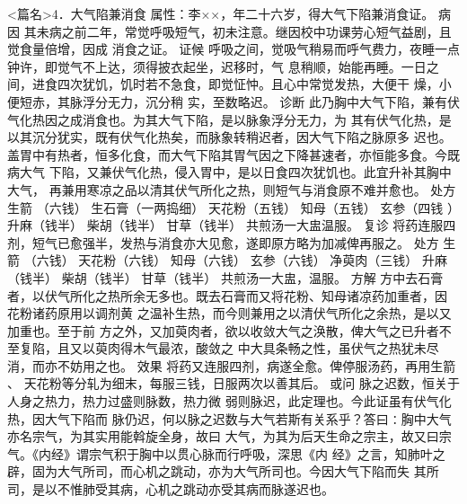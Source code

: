 \documentclass[a4paper,12pt,UTF8,twoside]{ctexbook}
\begin{document}
<篇名>4．大气陷兼消食
属性：李××，年二十六岁，得大气下陷兼消食证。 
病因 其未病之前二年，常觉呼吸短气，初未注意。继因校中功课劳心短气益剧，且觉食量倍增，因成 
消食之证。 
证候 呼吸之间，觉吸气稍易而呼气费力，夜睡一点钟许，即觉气不上达，须得披衣起坐，迟移时，气 
息稍顺，始能再睡。一日之间，进食四次犹饥，饥时若不急食，即觉怔忡。且心中常觉发热，大便干 
燥，小便短赤，其脉浮分无力，沉分稍 
实，至数略迟。 
诊断 此乃胸中大气下陷，兼有伏气化热因之成消食也。为其大气下陷，是以脉象浮分无力，为 
其有伏气化热，是以其沉分犹实，既有伏气化热矣，而脉象转稍迟者，因大气下陷之脉原多 
迟也。盖胃中有热者，恒多化食，而大气下陷其胃气因之下降甚速者，亦恒能多食。今既病大气 
下陷，又兼伏气化热，侵入胃中，是以日食四次犹饥也。此宜升补其胸中大气， 
再兼用寒凉之品以清其伏气所化之热，则短气与消食原不难并愈也。 
处方 生箭 （六钱） 生石膏（一两捣细） 天花粉（五钱） 知母（五钱） 玄参（四钱 
）升麻（钱半） 柴胡（钱半） 甘草（钱半） 
共煎汤一大盅温服。 
复诊 将药连服四剂，短气已愈强半，发热与消食亦大见愈，遂即原方略为加减俾再服之。 
处方 生箭 （六钱） 天花粉（六钱） 知母（六钱） 玄参（六钱） 
净萸肉（三钱） 升麻（钱半） 柴胡（钱半） 甘草（钱半） 
共煎汤一大盅，温服。 
方解 方中去石膏者，以伏气所化之热所余无多也。既去石膏而又将花粉、知母诸凉药加重者，因 
花粉诸药原用以调剂黄 之温补生热，而今则兼用之以清伏气所化之余热，是以又加重也。至于前 
方之外，又加萸肉者，欲以收敛大气之涣散，俾大气之已升者不至复陷，且又以萸肉得木气最浓，酸敛之 
中大具条畅之性，虽伏气之热犹未尽消，而亦不妨用之也。 
效果 将药又连服四剂，病遂全愈。俾停服汤药，再用生箭 、 
天花粉等分轧为细末，每服三钱，日服两次以善其后。 
或问 脉之迟数，恒关于人身之热力，热力过盛则脉数，热力微 
弱则脉迟，此定理也。今此证虽有伏气化热，因大气下陷而 
脉仍迟，何以脉之迟数与大气若斯有关系乎？答曰∶胸中大气亦名宗气，为其实用能斡旋全身，故曰 
大气，为其为后天生命之宗主，故又曰宗气。《内经》谓宗气积于胸中以贯心脉而行呼吸，深思《内 
经》之言，知肺叶之 辟，固为大气所司，而心机之跳动，亦为大气所司也。今因大气下陷而失 
其所司，是以不惟肺受其病，心机之跳动亦受其病而脉遂迟也。 
\end{document}
